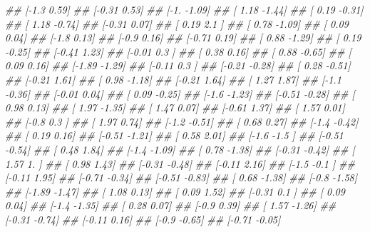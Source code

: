 \documentclass[
]{book}
\newenvironment{Shaded}{\begin{snugshade}}{\end{snugshade}}
\newcommand{\CommentTok}[1]{\textcolor[rgb]{0.56,0.35,0.01}{\textit{#1}}}
\theoremstyle{definition}
\theoremstyle{definition}
\theoremstyle{definition}
\theoremstyle{definition}
\theoremstyle{remark}
\begin{document}
\begin{Shaded}
\begin{Highlighting}[]
\CommentTok{\#\#  [{-}1.3   0.59]}
\CommentTok{\#\#  [{-}0.31  0.53]}
\CommentTok{\#\#  [{-}1.   {-}1.09]}
\CommentTok{\#\#  [ 1.18 {-}1.44]}
\CommentTok{\#\#  [ 0.19 {-}0.31]}
\CommentTok{\#\#  [ 1.18 {-}0.74]}
\CommentTok{\#\#  [{-}0.31  0.07]}
\CommentTok{\#\#  [ 0.19  2.1 ]}
\CommentTok{\#\#  [ 0.78 {-}1.09]}
\CommentTok{\#\#  [ 0.09  0.04]}
\CommentTok{\#\#  [{-}1.8   0.13]}
\CommentTok{\#\#  [{-}0.9   0.16]}
\CommentTok{\#\#  [{-}0.71  0.19]}
\CommentTok{\#\#  [ 0.88 {-}1.29]}
\CommentTok{\#\#  [ 0.19 {-}0.25]}
\CommentTok{\#\#  [{-}0.41  1.23]}
\CommentTok{\#\#  [{-}0.01  0.3 ]}
\CommentTok{\#\#  [ 0.38  0.16]}
\CommentTok{\#\#  [ 0.88 {-}0.65]}
\CommentTok{\#\#  [ 0.09  0.16]}
\CommentTok{\#\#  [{-}1.89 {-}1.29]}
\CommentTok{\#\#  [{-}0.11  0.3 ]}
\CommentTok{\#\#  [{-}0.21 {-}0.28]}
\CommentTok{\#\#  [ 0.28 {-}0.51]}
\CommentTok{\#\#  [{-}0.21  1.61]}
\CommentTok{\#\#  [ 0.98 {-}1.18]}
\CommentTok{\#\#  [{-}0.21  1.64]}
\CommentTok{\#\#  [ 1.27  1.87]}
\CommentTok{\#\#  [{-}1.1  {-}0.36]}
\CommentTok{\#\#  [{-}0.01  0.04]}
\CommentTok{\#\#  [ 0.09 {-}0.25]}
\CommentTok{\#\#  [{-}1.6  {-}1.23]}
\CommentTok{\#\#  [{-}0.51 {-}0.28]}
\CommentTok{\#\#  [ 0.98  0.13]}
\CommentTok{\#\#  [ 1.97 {-}1.35]}
\CommentTok{\#\#  [ 1.47  0.07]}
\CommentTok{\#\#  [{-}0.61  1.37]}
\CommentTok{\#\#  [ 1.57  0.01]}
\CommentTok{\#\#  [{-}0.8   0.3 ]}
\CommentTok{\#\#  [ 1.97  0.74]}
\CommentTok{\#\#  [{-}1.2  {-}0.51]}
\CommentTok{\#\#  [ 0.68  0.27]}
\CommentTok{\#\#  [{-}1.4  {-}0.42]}
\CommentTok{\#\#  [ 0.19  0.16]}
\CommentTok{\#\#  [{-}0.51 {-}1.21]}
\CommentTok{\#\#  [ 0.58  2.01]}
\CommentTok{\#\#  [{-}1.6  {-}1.5 ]}
\CommentTok{\#\#  [{-}0.51 {-}0.54]}
\CommentTok{\#\#  [ 0.48  1.84]}
\CommentTok{\#\#  [{-}1.4  {-}1.09]}
\CommentTok{\#\#  [ 0.78 {-}1.38]}
\CommentTok{\#\#  [{-}0.31 {-}0.42]}
\CommentTok{\#\#  [ 1.57  1.  ]}
\CommentTok{\#\#  [ 0.98  1.43]}
\CommentTok{\#\#  [{-}0.31 {-}0.48]}
\CommentTok{\#\#  [{-}0.11  2.16]}
\CommentTok{\#\#  [{-}1.5  {-}0.1 ]}
\CommentTok{\#\#  [{-}0.11  1.95]}
\CommentTok{\#\#  [{-}0.71 {-}0.34]}
\CommentTok{\#\#  [{-}0.51 {-}0.83]}
\CommentTok{\#\#  [ 0.68 {-}1.38]}
\CommentTok{\#\#  [{-}0.8  {-}1.58]}
\CommentTok{\#\#  [{-}1.89 {-}1.47]}
\CommentTok{\#\#  [ 1.08  0.13]}
\CommentTok{\#\#  [ 0.09  1.52]}
\CommentTok{\#\#  [{-}0.31  0.1 ]}
\CommentTok{\#\#  [ 0.09  0.04]}
\CommentTok{\#\#  [{-}1.4  {-}1.35]}
\CommentTok{\#\#  [ 0.28  0.07]}
\CommentTok{\#\#  [{-}0.9   0.39]}
\CommentTok{\#\#  [ 1.57 {-}1.26]}
\CommentTok{\#\#  [{-}0.31 {-}0.74]}
\CommentTok{\#\#  [{-}0.11  0.16]}
\CommentTok{\#\#  [{-}0.9  {-}0.65]}
\CommentTok{\#\#  [{-}0.71 {-}0.05]}

\end{Highlighting}
\end{Shaded}
\end{document}
